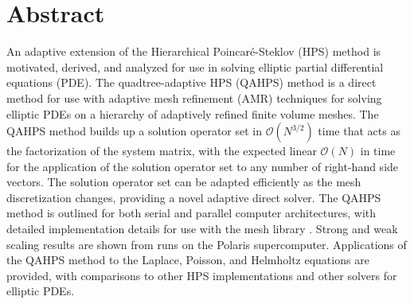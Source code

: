 \chapter*{Abstract}

An adaptive extension of the Hierarchical Poincar\'e-Steklov (HPS) method \citep{gillman2014direct} is motivated, derived, and analyzed for use in solving elliptic partial differential equations (PDE). The quadtree-adaptive HPS (QAHPS) method is a direct method for use with adaptive mesh refinement (AMR) techniques for solving elliptic PDEs on a hierarchy of adaptively refined finite volume meshes. The QAHPS method builds up a solution operator set in $\mathcal{O}(N^{3/2})$ time that acts as the factorization of the system matrix, with the expected linear $\mathcal{O}(N)$ in time for the application of the solution operator set to any number of right-hand side vectors. The solution operator set can be adapted efficiently as the mesh discretization changes, providing a novel adaptive direct solver. The QAHPS method is outlined for both serial and parallel computer architectures, with detailed implementation details for use with the mesh library \pforest \citep{burstedde2011p4est}. Strong and weak scaling results are shown from runs on the Polaris supercomputer. Applications of the QAHPS method to the Laplace, Poisson, and Helmholtz equations are provided, with comparisons to other HPS implementations and other solvers for elliptic PDEs.